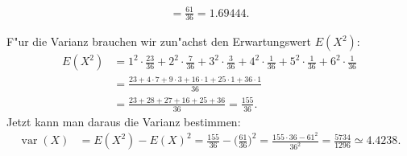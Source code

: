 \begin{loesung}
\begin{teilaufgaben}
\begin{align*}
=\frac{61}{36}=1.69444.
\end{align*}
\item
F"ur die Varianz brauchen wir zun"achst den Erwartungswert $E(X^2)$:
\begin{align*}
E(X^2)&=
1^2\cdot\frac{23}{36}+
2^2\cdot\frac{7}{36}+
3^2\cdot\frac{3}{36}+
4^2\cdot\frac{1}{36}+
5^2\cdot\frac{1}{36}+
6^2\cdot\frac{1}{36}
\\
&=\frac{23 + 4\cdot 7 + 9\cdot 3+16\cdot 1+25\cdot 1+36\cdot 1}{36}\\
&=\frac{23 + 28 + 27 + 16+25+36}{36}
=\frac{155}{36}.
\end{align*}
Jetzt kann man daraus die Varianz bestimmen:
\begin{align*}
\operatorname{var}(X)
&=
E(X^2)-E(X)^2
=
\frac{155}{36}-\biggl(\frac{61}{36}\biggr)^2
=
\frac{155\cdot 36-61^2}{36^2}=\frac{5734}{1296}\simeq 4.4238.
\end{align*}
\end{teilaufgaben}
\end{loesung}

